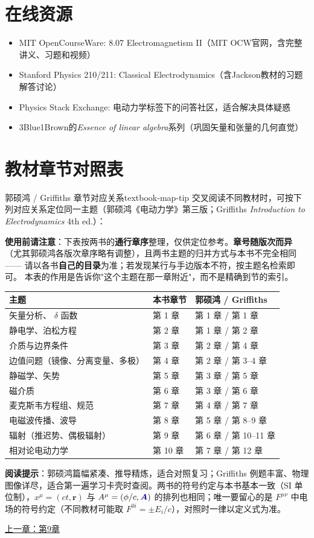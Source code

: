 \documentclass[11pt,a4paper,openany,oneside]{book}
\newcommand{\vecA}{\textcolor{blue!70!black}{\vect{A}}}
\newcommand{\vect}[1]{\bm{#1}}
\begin{document}
\section*{在线资源}
\begin{itemize}
\item MIT OpenCourseWare: 8.07 Electromagnetism II（MIT OCW官网，含完整讲义、习题和视频）
\item Stanford Physics 210/211: Classical Electrodynamics（含Jackson教材的习题解答讨论）
\item Physics Stack Exchange: 电动力学标签下的问答社区，适合解决具体疑惑
\item 3Blue1Brown的\textit{Essence of linear algebra}系列（巩固矢量和张量的几何直觉）
\end{itemize}

\section*{教材章节对照表}

\begin{tip}{郭硕鸿 / Griffiths 章节对应关系}{textbook-map-tip}
交叉阅读不同教材时，可按下列对应关系定位同一主题（郭硕鸿《电动力学》第三版；Griffiths \textit{Introduction to Electrodynamics} 4th ed.）：

\textbf{使用前请注意}：下表按两书的\textbf{通行章序}整理，仅供定位参考。\textbf{章号随版次而异}
（尤其郭硕鸿各版次章序略有调整），且两书主题的归并方式与本书不完全相同——
请以各书\textbf{自己的目录}为准；若发现某行与手边版本不符，按主题名检索即可。
本表的作用是告诉你"这个主题在那一章附近"，而不是精确到节的索引。
\begin{center}
\small
\begin{tabular}{@{}p{4.2cm}p{4.6cm}p{4.6cm}@{}}
\toprule
\textbf{主题} & \textbf{本书章节} & \textbf{郭硕鸿 / Griffiths} \\
\midrule
矢量分析、 $\delta$ 函数 & 第 1 章 & 第 1 章 / 第 1 章 \\
静电学、泊松方程 & 第 2 章 & 第 1 章 / 第 2 章 \\
介质与边界条件 & 第 3 章 & 第 2 章 / 第 4 章 \\
边值问题（镜像、分离变量、多极） & 第 4 章 & 第 2 章 / 第 3--4 章 \\
静磁学、矢势 & 第 5 章 & 第 3 章 / 第 5 章 \\
磁介质 & 第 6 章 & 第 3 章 / 第 6 章 \\
麦克斯韦方程组、规范 & 第 7 章 & 第 4 章 / 第 7 章 \\
电磁波传播、波导 & 第 8 章 & 第 5 章 / 第 8--9 章 \\
辐射（推迟势、偶极辐射） & 第 9 章 & 第 6 章 / 第 10--11 章 \\
相对论电动力学 & 第 10 章 & 第 7 章 / 第 12 章 \\
\bottomrule
\end{tabular}
\end{center}
\textbf{阅读提示}：郭硕鸿篇幅紧凑、推导精炼，适合对照复习；Griffiths 例题丰富、物理图像详尽，适合第一遍学习卡壳时查阅。两书的符号约定与本书基本一致（SI 单位制），$x^\mu=(ct,\vect{r})$ 与 $A^\mu=(\phi/c,\vecA)$ 的排列也相同；唯一要留心的是 $F^{\mu\nu}$ 中电场的符号约定（不同教材可能取 $F^{0i}=\pm E_i/c$），对照时一律以定义式为准。
\end{tip}


\begin{center}\small \hyperlink{ch9-goal}{上一章：第9章}\end{center}
\end{document}
